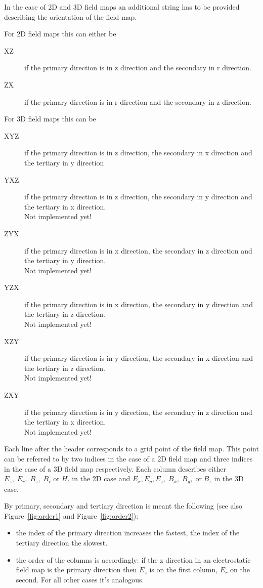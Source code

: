 In the case of 2D and 3D field maps an additional string has to be provided describing the orientation of the field map. 

For 2D field maps this can either be 
\begin{description}
\item[XZ]
if the primary direction is in z direction and the secondary in r direction.
\item[ZX]
if the primary direction is in r direction and the secondary in z direction.
\end{description}

For 3D field maps this can be
\begin{description}
\item[XYZ]
if the primary direction is in z direction, the secondary in x direction and the tertiary in y direction
\item[YXZ]
if the primary direction is in z direction, the secondary in y direction and the tertiary in x direction.\\
Not implemented yet!
\item[ZYX]
if the primary direction is in x direction, the secondary in z direction and the tertiary in y direction.\\
Not implemented yet!
\item[YZX]
if the primary direction is in x direction, the secondary in y direction and the tertiary in z direction.\\
Not implemented yet!
\item[XZY]
if the primary direction is in y direction, the secondary in x direction and the tertiary in z direction.\\
Not implemented yet!
\item[ZXY]
if the primary direction is in y direction, the secondary in z direction and the tertiary in x direction.\\
Not implemented yet!
\end{description}

Each line after the header corresponds to a grid point of the field map. This point can be referred to by two indices in the case of a 2D field map and three indices in the case of a 3D field map respectively. Each column describes either $E_z,\; E_r,\; B_z,\; B_r\; \text{or}\;H_t$ in the 2D case and $E_x, E_y, E_z,\; B_x,\; B_y,\;\text{or}\; B_z$ in the 3D case.

By primary, secondary and tertiary direction is meant the following (see also Figure~\ref{fig:order1} and Figure~\ref{fig:order2}):
\begin{itemize}
\item
the index of the primary direction increases the fastest, the index of the tertiary direction the slowest. 
\item
the order of the columns is accordingly: if the z direction in an electrostatic field map is the primary direction then $E_z$ is on the first column, $E_r$ on the second. For all other cases it's analogous.
\end{itemize}

